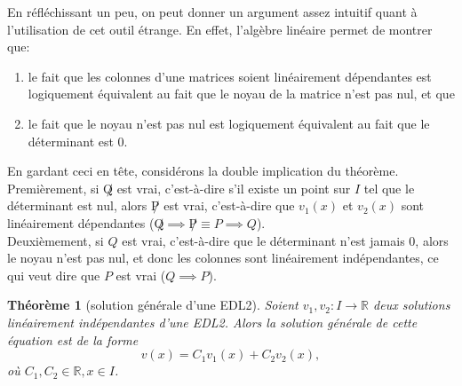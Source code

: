 \documentclass{report}
\theoremstyle{plain}
\newtheorem{thm}{Théorème}[section]
\theoremstyle{definition}
\theoremstyle{remark}
\begin{document}
En réfléchissant un peu, on peut donner un argument assez intuitif quant à l'utilisation de cet outil étrange. En effet, l'algèbre linéaire permet de montrer que:
\begin{enumerate}
	\item le fait que les colonnes d'une matrices soient linéairement dépendantes est logiquement équivalent au fait que le noyau de la matrice n'est pas nul, et que
	\item le fait que le noyau n'est pas nul est logiquement équivalent au fait que le déterminant est 0.
\end{enumerate}
 En gardant ceci en tête, considérons la double implication du théorème. \\
Premièrement, si $\not Q$ est vrai, c'est-à-dire s'il existe un point sur $I$ tel que le déterminant est nul, alors $\not P$ est vrai, c'est-à-dire que $v_1(x)$ et $v_2(x)$ sont linéairement dépendantes ($\not Q \implies \not P \equiv P \implies Q$). \\ Deuxièmement, si $Q$ est vrai, c'est-à-dire que le déterminant n'est jamais 0, alors le noyau n'est pas nul, et donc les colonnes sont linéairement indépendantes, ce qui veut dire que $P$ est vrai ($Q \implies P$).

\begin{thm}[solution générale d'une EDL2]
	Soient $v_1, v_2 : I \to \mathbb R$ deux solutions linéairement indépendantes d'une EDL2. Alors la solution générale de cette équation est de la forme
	\begin{equation}
		v(x) = C_1 v_1(x) + C_2 v_2(x),
	\end{equation}
où $C_1, C_2 \in \mathbb R, x \in I$.
\end{thm}
\end{document}
